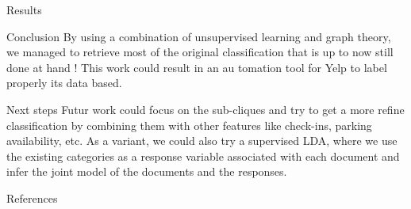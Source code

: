 \documentclass[final]{beamer}
\newlength{\onecolwid}
\begin{document}
\begin{frame}[t]
\begin{columns}[t]
\begin{column}{\onecolwid}
\begin{block}{Results}
\end{block}
\begin{alertblock}{Conclusion}
\small
By using a combination of unsupervised learning and graph theory, we managed to retrieve most of the original classification that is up to now still done at hand ! This work could result in an au tomation tool for Yelp to label properly its data based. 
\end{alertblock}

\begin{block}{Next steps}\vspace{-0.2in}
\small
Futur work could focus on the sub-cliques and try to get a more refine classification by combining them with other features like check-ins, parking availability, etc. As a variant, we could also try a supervised LDA, where we use the existing categories as a response variable associated with each document and infer the joint model of the documents and the responses.
\end{block}


\begin{block}{References}
\nocite{*} %
\tiny{
}

\end{block}


\end{column} %

\end{columns} %

\end{frame} %
\end{document}
